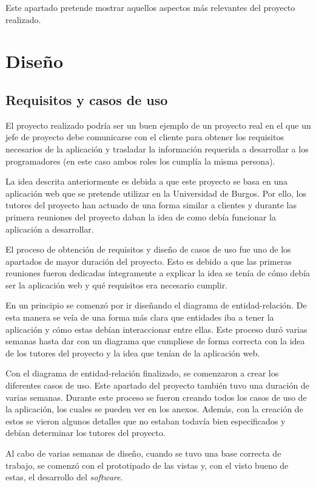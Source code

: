 
Este apartado pretende mostrar aquellos aspectos más relevantes del proyecto realizado.

\section{Diseño}
\subsection{Requisitos y casos de uso}
El proyecto realizado podría ser un buen ejemplo de un proyecto real en el que un jefe de proyecto debe comunicarse con el cliente para obtener los requisitos necesarios de la aplicación y trasladar la información requerida a desarrollar a los programadores (en este caso ambos roles los cumplía la misma persona).

La idea descrita anteriormente es debida a que este proyecto se basa en una aplicación web que se pretende utilizar en la Universidad de Burgos. 
Por ello, los tutores del proyecto han actuado de una forma similar a clientes y durante las primera reuniones del proyecto daban la idea de como debía funcionar la aplicación a desarrollar.

El proceso de obtención de requisitos y diseño de casos de uso fue uno de los apartados de mayor duración del proyecto.
Esto es debido a que las primeras reuniones fueron dedicadas íntegramente a explicar la idea se tenía de cómo debía ser la aplicación web y qué requisitos era necesario cumplir.

En un principio se comenzó por ir diseñando el diagrama de entidad-relación.
De esta manera se veía de una forma más clara que entidades iba a tener la aplicación y cómo estas debían interaccionar entre ellas.
Este proceso duró varias semanas hasta dar con un diagrama que cumpliese de forma correcta con la idea de los tutores del proyecto y la idea que tenían de la aplicación web.

Con el diagrama de entidad-relación finalizado, se comenzaron a crear los diferentes casos de uso.
Este apartado del proyecto también tuvo una duración de varias semanas.
Durante este proceso se fueron creando todos los casos de uso de la aplicación, los cuales se pueden ver en los anexos.
Además, con la creación de estos se vieron algunos detalles que no estaban todavía bien especificados y debían determinar los tutores del proyecto.

Al cabo de varias semanas de diseño, cuando se tuvo una base correcta de trabajo, se comenzó con el prototipado de las vistas y, con el visto bueno de estas, el desarrollo del \textit{software}.

